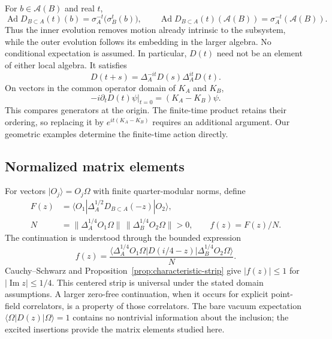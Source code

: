 \documentclass[a4paper,11pt]{article}
\theoremstyle{definition}
\begin{document}
For $b\in\mathcal A(B)$ and real $t$,
\begin{equation}
 \operatorname{Ad}D_{B\subset A}(t)(b)
 =\sigma_A^{-t}\bigl(\sigma_B^t(b)\bigr),\qquad
 \operatorname{Ad}D_{B\subset A}(t)(\mathcal A(B))
 =\sigma_A^{-t}(\mathcal A(B)).
 \label{eq:qft-algebra-transport}
\end{equation}
Thus the inner evolution removes motion already intrinsic to the subsystem,
while the outer evolution follows its embedding in the larger algebra.
No conditional expectation is assumed. In particular, $D(t)$ need not be an
element of either local algebra. It satisfies
\begin{equation}
 D(t+s)=\Delta_A^{-it}D(s)\Delta_A^{it}D(t).
 \label{eq:qft-cocycle}
\end{equation}
On vectors in the common operator domain of $K_A$ and $K_B$,
\begin{equation}
 -i\left.\partial_tD(t)\psi\right|_{t=0}=(K_A-K_B)\psi.
 \label{eq:qft-infinitesimal}
\end{equation}
This compares generators at the origin. The finite-time product retains their
ordering, so replacing it by $e^{it(K_A-K_B)}$ requires an additional argument.
Our geometric examples determine the finite-time action directly.

\subsection{Normalized matrix elements}

For vectors $|O_j\rangle=O_j\Omega$ with finite quarter-modular norms, define
\begin{align}
 F(z)&=\langle O_1|\Delta_A^{1/2}D_{B\subset A}(-z)|O_2\rangle,\nonumber\\
 N&=\|\Delta_A^{1/4}O_1\Omega\|\,
      \|\Delta_B^{1/4}O_2\Omega\|>0,\qquad f(z)=F(z)/N.
 \label{eq:qft-matrix-element}
\end{align}
The continuation is understood through the bounded expression
\begin{equation}
 f(z)=\frac{\langle\Delta_A^{1/4}O_1\Omega|
 D(i/4-z)|\Delta_B^{1/4}O_2\Omega\rangle}{N}.
 \label{eq:qft-centered-strip}
\end{equation}
Cauchy--Schwarz and Proposition~\ref{prop:characteristic-strip} give
$|f(z)|\leq1$ for $|\operatorname{Im}z|\leq1/4$. This centered strip is universal
under the stated domain assumptions. A larger zero-free continuation, when it
occurs for explicit point-field correlators, is a property of those correlators.
The bare vacuum expectation $\langle\Omega|D(z)|\Omega\rangle=1$ contains no
nontrivial information about the inclusion; the excited insertions provide the
matrix elements studied here.
\end{document}
